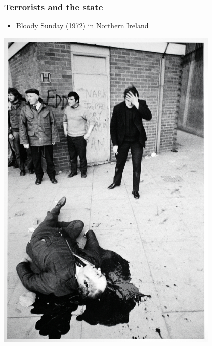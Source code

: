 \documentclass[aspectratio=43]{beamer}
\begin{document}
\begin{frame}
\frametitle{Terrorists and the state}
\centering

\begin{itemize}
  \item Bloody Sunday (1972) in Northern Ireland
\end{itemize}

\vspace{10pt}

\begin{minipage}{0.49\textwidth}\centering
\includegraphics[width = 0.8\textwidth]{img/bloody-sunday}
\end{minipage}\hfill
\begin{minipage}{0.49\textwidth}\centering

\end{minipage}
\end{frame}
\end{document}
